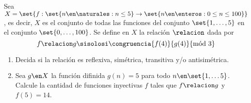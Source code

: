 \begin{enunciado}{\ejExtra}
  Sea $X = \set{f: \set{ n \en \naturales : n \leq 5} \to \set{n \en \enteros : 0 \leq n \leq 100}}$, es decir, $X$ es el conjunto de todas
  las funciones del conjunto $\set{1, \dots, 5}$ en el conjunto $\set{0,\dots, 100}$. Se define en $X$ la relación $\relacion$ dada por
  $$
    f \relacion g \sisolosi \congruencia{f(4)}{g(4)}{\text{mód } 3}
  $$
  \begin{enumerate}[label=\alph*)]
    \item Decida si la relación es reflexiva, simétrica, transitiva y/o antisimétrica.
    \item Sea $g \en X$ la función difinida $g(n) = 5$ para todo $n \en \set{1, \dots 5}$. Calcule la cantidad de funciones
          inyectivas $f$ tales que $f \relacion g$ y $f(5) = 14$.
  \end{enumerate}
\end{enunciado}

